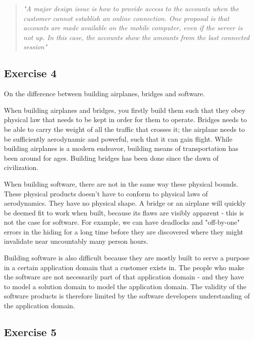 \documentclass[12pt,letterpaper]{article}
\begin{document}
\begin{quote}
  \textit{"A major design issue is how to provide access to the accounts when the customer cannot establish an online connection. One proposal is that accounts are made available on the mobile computer, even if the server is not up. In this case, the accounts show the amounts from the last connected session"}
\end{quote}

\subsection{Exercise 4}

On the difference between building airplanes, bridges and software.

When building airplanes and bridges, you firstly build them such that they obey physical law that 
needs to be kept in order for them to operate. Bridges needs to be able to carry the weight of
all the traffic that crosses it; the airplane needs to be sufficiently aerodynamic and powerful, 
such that it can gain flight. While building airplanes is a modern endeavor, building
means of transportation has been around for ages. Building bridges has been done since the dawn
of civilization.

When building software, there are not in the same way these physical bounds. 
These physical products doesn't have to conform to physical laws of aerodynamics. They
have no physical shape. A bridge or an airplane will quickly be deemed fit to work when built,
because its flaws are visibly apparent - this is not the case for software. For example,
we can have deadlocks and "off-by-one" errors in the hiding for a long time before
they are discovered where they might invalidate near uncountably many person hours.

Building software is also difficult because they are mostly built to serve a purpose in 
a certain application domain that a customer exists in. The people who make the software 
are not necessarily part of that application domain - and they have to model a solution domain 
to model the application domain. The validity of the software products is therefore limited 
by the software developers understanding of the application domain. 

\subsection{Exercise 5}
\end{document}
